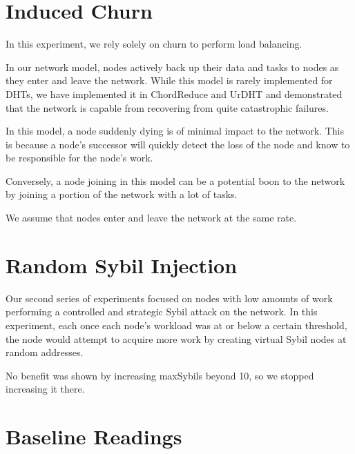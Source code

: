 \section{Induced Churn}
In this experiment, we rely solely on churn to perform load balancing.

In our network model, nodes actively back up their data and tasks to nodes as they enter and leave the network.
While this model is rarely implemented for DHTs, we have implemented it in ChordReduce\cite{chordreduce} and UrDHT\cite{urdht} and demonstrated that the network is capable from recovering from quite catastrophic failures.

In this model, a node suddenly dying is of minimal impact to the network.
This is because a node's successor will quickly detect the loss of the node and know to be responsible for the node's work.

Conversely, a node joining in this model can be a potential boon to the network by joining a portion of the network with a lot of tasks.


We assume that nodes enter and leave the network at the same rate.


\section{Random Sybil Injection}
Our second series of experiments focused on nodes with low amounts of work performing a controlled and strategic Sybil attack \cite{sybil} on the network.
In this experiment, each once each node's workload was at or below a certain threshold, the node would attempt to acquire more work by creating virtual Sybil nodes at random addresses.




No benefit was shown by increasing maxSybils beyond 10, so we stopped increasing it there.



\section{Baseline Readings}